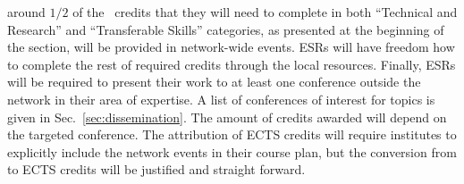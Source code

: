 around $1/2$ of the \acronym\ credits
that they will need to complete in both ``Technical and Research'' and
``Transferable Skills'' categories, as presented at the beginning of
the section, will be provided in network-wide events. 
ESRs will have freedom how to complete the rest of required credits through the local
resources. 
Finally, ESRs will be required to
present their work to at least one conference outside the network in their area of expertise. A list of conferences of interest for
\acronym topics is given in Sec.~\ref{sec:dissemination}.
The amount of credits awarded will depend on the targeted conference.  
The attribution of ECTS credits will require institutes to explicitly
include the network events in their course plan, but the conversion
from \acronym to ECTS credits will be justified and straight forward. 

\vspace{-5mm}



